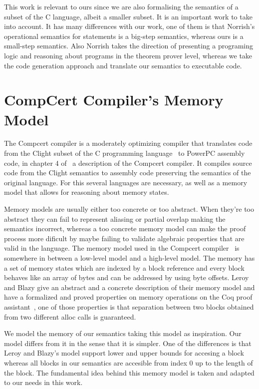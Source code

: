 This work is relevant to ours since we are also formalising the semantics of a subset of the C language, albeit a smaller subset.
It is an important work to take into account.
It has many differences with our work, one of them is that Norrish's operational semantics for statements is a big-step semantics, whereas ours is a small-step semantics.
Also Norrish takes the direction of presenting a programing logic and reasoning about programs in the theorem prover level, whereas we take the code generation approach and translate our semantics to executable code.


\section{CompCert Compiler's Memory Model}

The Compcert compiler is a moderately optimizing compiler that translates code from the Clight subset of the C programming language~\parencite{clight} to PowerPC assembly code, in chapter 4 of~\parencite{compcert-float-point} a description of the Compcert compiler.
It compiles source code from the Clight semantics to assembly code preserving the semantics of the original language.
For this several languages are necessary, as well as a memory model that allows for reasoning about memory states.

Memory models are usually either too concrete or too abstract.
When they're too abstract they can fail to represent aliasing or partial overlap making the semantics incorrect, whereas a too concrete memory model can make the proof process more dificult by maybe failing to validate algebraic properties that are valid in the language.
The memory model used in the Compcert compiler~\parencite{leroy-blazy-memory-model} is somewhere in between a low-level model and a high-level model.
The memory has a set of memory states which are indexed by a block reference and every block behaves like an array of bytes and can be addressed by using byte offsets.
Leroy and Blazy give an abstract and a concrete description of their memory model and have a formalized and proved properties on memory operations on the Coq proof assistant~\parencite{coq-doc}, one of those properties is that separation between two blocks obtained from two different alloc calls is guaranteed.

We model the memory of our semantics taking this model as inspiration.
Our model differs from it in the sense that it is simpler.
One of the differences is that Leroy and Blazy's model support lower and upper bounds for accesing a block whereas all blocks in our semantics are accesible from index $0$ up to the length of the block.
The fundamental idea behind this memory model is taken and adapted to our needs in this work.


